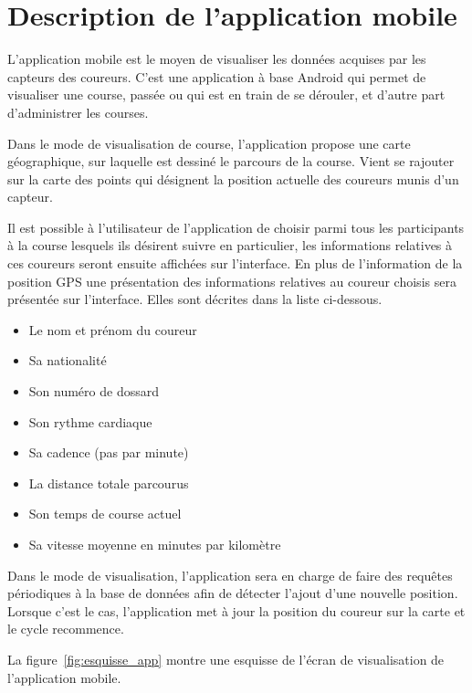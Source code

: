 
\chapter{Description de l'application mobile}

L’application mobile est le moyen de visualiser les données acquises par les capteurs des coureurs. C’est une application à base Android qui permet de visualiser une course, passée ou qui est en train de se dérouler, et d’autre part d’administrer les courses.

Dans le mode de visualisation de course, l’application propose une carte géographique, sur laquelle est dessiné le parcours de la course. Vient se rajouter sur la carte des points qui désignent la position actuelle des coureurs munis d’un capteur.

Il est possible à l’utilisateur de l’application de choisir parmi tous les participants à la course lesquels ils désirent suivre en particulier, les informations relatives à ces coureurs seront ensuite affichées sur l’interface. En plus de l’information de la position GPS une présentation des informations relatives au coureur choisis sera présentée sur l’interface. Elles sont décrites dans la liste ci-dessous.

\begin{itemize}
\item Le nom et prénom du coureur
\item Sa nationalité
\item Son numéro de dossard
\item Son rythme cardiaque
\item Sa cadence (pas par minute)
\item La distance totale parcourus
\item Son temps de course actuel
\item Sa vitesse moyenne en minutes par kilomètre
\end{itemize}

Dans le mode de visualisation, l’application sera en charge de faire des requêtes périodiques à la base de données afin de détecter l’ajout d’une nouvelle position. Lorsque c’est le cas, l’application met à jour la position du coureur sur la carte et le cycle recommence.

La figure~\ref{fig:esquisse_app} montre une esquisse de l'écran de visualisation de l'application mobile. 

